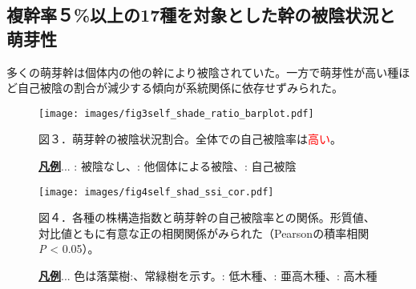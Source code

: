 \documentclass[a0, 30pt, plainboxedsections]{sciposter} %
\renewcommand{\baselinestretch}{1.2}
\begin{document}
\begin{multicols}{2}
\begin{mdframed}[style=subsection.frame,frametitle={\textbf{\LARGE{\ding{192}}\Large{25種の株構造は種間で大きく異なる}}}]
\end{mdframed}

\renewcommand{\baselinestretch}{0.8}
\begin{mdframed}[style=subsection.frame,frametitle=\textbf{\LARGE{\ding{194}}\Large{萌芽性が強い種ほど自己被陰率が下がる}}]
\renewcommand{\baselinestretch}{1.2}

\subsection*{複幹率５\%以上の17種を対象とした幹の被陰状況と萌芽性}

多くの萌芽幹は個体内の他の幹により被陰されていた。一方で萌芽性が高い種ほど自己被陰の割合が減少する傾向が系統関係に依存せずみられた。

\renewcommand{\baselinestretch}{0.8}
\begin{figure}
 \begin{minipage}{0.5\hsize}
  \centering
   \texttt{[image: images/fig3self\_shade\_ratio\_barplot.pdf]} %

   {\tiny 図３．萌芽幹の被陰状況割合。全体での自己被陰率は\textcolor{red}{高い}。\newline
   
   \textbf{\underline{凡例}}... \textcolor{black}{}: 被陰なし、\textcolor{lightgray}{}: 他個体による被陰、\textcolor{white}{}: 自己被陰}
 \end{minipage}
 \begin{minipage}{0.5\hsize}
  \centering
   \texttt{[image: images/fig4self\_shad\_ssi\_cor.pdf]}
   
   {\tiny 図４．各種の株構造指数と萌芽幹の自己被陰率との関係。形質値、対比値ともに有意な正の相関関係がみられた（Pearsonの積率相関 \textit{P} < 0.05）。
   
   \textbf{\underline{凡例}}... 色は\textcolor{Orange1}{落葉樹}:、\textcolor{Blue1}{常緑樹}を示す。: 低木種、: 亜高木種、: 高木種}
 \end{minipage}
\end{figure}
\renewcommand{\baselinestretch}{1.2}


\end{mdframed}

\columnbreak
\renewcommand{\baselinestretch}{0.8}
\begin{mdframed}[style=subsection.frame,frametitle=\textbf{\LARGE{\ding{193}}\Large{樹高が高くなるほど萌芽性が強くなる}}]
\renewcommand{\baselinestretch}{1.2} %


\end{mdframed}
\end{multicols}
\end{document}
